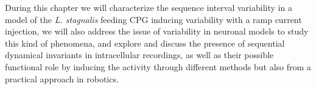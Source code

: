 During this chapter we will characterize the sequence interval variability in a model of the \textit{L. stagnalis} feeding CPG inducing variability with a ramp current injection, we will also address the issue of variability in neuronal models to study this kind of phenomena, and explore and discuss the presence of sequential dynamical invariants in intracellular recordings, as well as their possible functional role by inducing the activity through different methods but also from a practical approach in robotics. 


